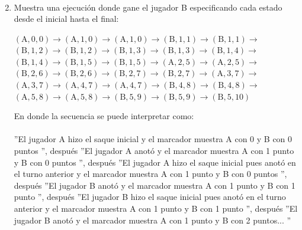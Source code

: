 \begin{exercise}
\begin{enumerate}
\[{\begin{array}{lcl}
                    \end{array}
                }
                \] 
            \item Muestra una ejecución donde gane el jugador B especificando cada estado desde el inicial hasta el final: 
                \begin{center}
                    $ (\text{A},0,0) \rightarrow (\text{A},1,0) \rightarrow (\text{A},1,0) \rightarrow (\text{B},1,1) \rightarrow (\text{B},1,1) \rightarrow$ \\
                    $ (\text{B},1,2) \rightarrow (\text{B},1,2) \rightarrow (\text{B},1,3) \rightarrow (\text{B},1,3) \rightarrow (\text{B},1,4) \rightarrow$ \\
                    $ (\text{B},1,4) \rightarrow (\text{B},1,5) \rightarrow (\text{B},1,5) \rightarrow (\text{A},2,5) \rightarrow (\text{A},2,5) \rightarrow$ \\
                    $ (\text{B},2,6) \rightarrow (\text{B},2,6) \rightarrow (\text{B},2,7) \rightarrow (\text{B},2,7) \rightarrow (\text{A},3,7) \rightarrow$ \\
                    $ (\text{A},3,7) \rightarrow (\text{A},4,7) \rightarrow (\text{A},4,7) \rightarrow (\text{B},4,8) \rightarrow (\text{B},4,8) \rightarrow $\\
                    $ (\text{A},5,8) \rightarrow (\text{A},5,8) \rightarrow (\text{B},5,9) \rightarrow (\text{B},5,9) \rightarrow (\text{B},5,10) $
                \end{center}
                En donde la secuencia se puede interpretar como: \\\\
                 ''El jugador A hizo el saque inicial y el marcador muestra A con 0 y B con 0 puntos '', después  ''El jugador A anotó y el marcador muestra A con 1 punto y B con 0 puntos '', después  ''El jugador A hizo el saque inicial pues anotó en el turno anterior y el marcador muestra A con 1 punto y B con 0 puntos '', después  ''El jugador B anotó y el marcador muestra A con 1  punto y B con 1 punto '', después  ''El jugador B hizo el saque inicial pues anotó en el turno anterior y el marcador muestra A con 1  punto y B con 1 punto '', después  ''El jugador B anotó y el marcador muestra A con 1  punto y B con 2 puntos... ''         
        \end{enumerate}

    \end{exercise}

